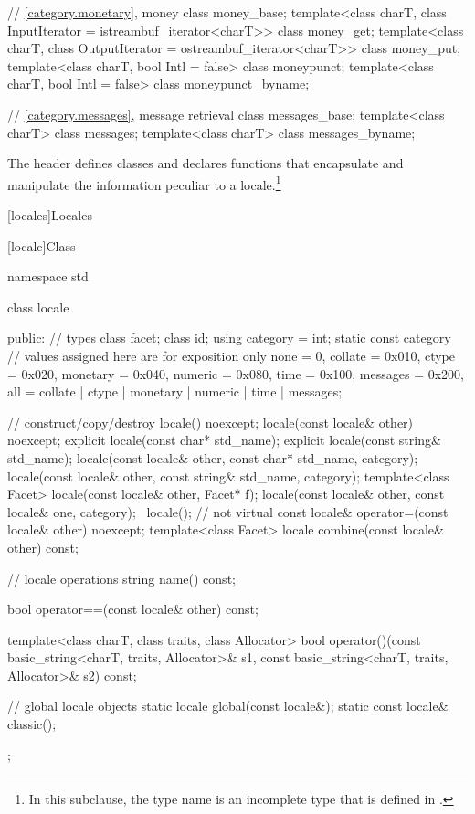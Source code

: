 \begin{codeblock}
{  // \ref{category.monetary}, money
  class money_base;
  template<class charT, class InputIterator = istreambuf_iterator<charT>>
    class money_get;
  template<class charT, class OutputIterator = ostreambuf_iterator<charT>>
    class money_put;
  template<class charT, bool Intl = false>
    class moneypunct;
  template<class charT, bool Intl = false>
    class moneypunct_byname;

  // \ref{category.messages}, message retrieval
  class messages_base;
  template<class charT> class messages;
  template<class charT> class messages_byname;
}
\end{codeblock}

\pnum
The header 
defines classes and declares functions that encapsulate and manipulate
the information peculiar to a locale.\footnote{In this subclause, the type name
is an incomplete type that is defined in .}

[locales]{Locales}

[locale]{Class }

\begin{codeblock}
namespace std {
  class locale {
  public:
    // types
    class facet;
    class id;
    using category = int;
    static const category   // values assigned here are for exposition only
      none     = 0,
      collate  = 0x010, ctype    = 0x020,
      monetary = 0x040, numeric  = 0x080,
      time     = 0x100, messages = 0x200,
      all = collate | ctype | monetary | numeric | time  | messages;

    // construct/copy/destroy
    locale() noexcept;
    locale(const locale& other) noexcept;
    explicit locale(const char* std_name);
    explicit locale(const string& std_name);
    locale(const locale& other, const char* std_name, category);
    locale(const locale& other, const string& std_name, category);
    template<class Facet> locale(const locale& other, Facet* f);
    locale(const locale& other, const locale& one, category);
    ~locale();                  // not virtual
    const locale& operator=(const locale& other) noexcept;
    template<class Facet> locale combine(const locale& other) const;

    // locale operations
    string name() const;

    bool operator==(const locale& other) const;

    template<class charT, class traits, class Allocator>
      bool operator()(const basic_string<charT, traits, Allocator>& s1,
                      const basic_string<charT, traits, Allocator>& s2) const;

    // global locale objects
    static       locale  global(const locale&);
    static const locale& classic();
  };
}
\end{codeblock}

